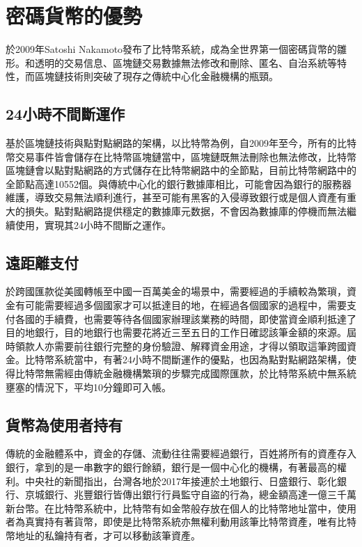 	\section{密碼貨幣的優勢}
	於2009年Satoshi Nakamoto發布了比特幣系統，成為全世界第一個密碼貨幣的雛形。和透明的交易信息、區塊鏈交易數據無法修改和刪除、匿名、⾃治系統等特性，而區塊鏈技術則突破了現存之傳統中⼼化⾦融機構的瓶頸。

		\subsection{24小時不間斷運作}
		基於區塊鏈技術與點對點網路的架構，以比特幣為例，自2009年至今，所有的比特幣交易事件皆會儲存在比特幣區塊鏈當中，區塊鏈既無法刪除也無法修改，比特幣區塊鏈會以點對點網路的方式儲存在比特幣網路中的全節點，目前比特幣網路中的全節點高達10552個。與傳統中心化的銀行數據庫相比，可能會因為銀行的服務器維護，導致交易無法順利進行，甚至可能有黑客的入侵導致銀行或是個人資產有重大的損失。點對點網路提供穩定的數據庫元数据，不會因為數據庫的停機而無法繼續使用，實現其24小時不間斷之運作。
		
		\subsection{遠距離支付}
		於跨國匯款從美國轉帳至中國一百萬美金的場景中，需要經過的手續較為繁瑣，資金有可能需要經過多個國家才可以抵達目的地，在經過各個國家的過程中，需要支付各國的手續費，也需要等待各個國家辦理該業務的時間，即使當資金順利抵達了目的地銀行，目的地銀行也需要花將近三至五日的工作日確認該筆金額的來源。屆時領款人亦需要前往銀行完整的身份驗證、解釋資金用途，才得以領取這筆跨國資金。比特幣系統當中，有著24小時不間斷運作的優點，也因為點對點網路架構，使得比特幣無需經由傳統金融機構繁瑣的步驟完成國際匯款，於比特幣系統中無系統壅塞的情況下，平均10分鐘即可入帳。

		\subsection{貨幣為使用者持有}
		傳統的金融體系中，資金的存儲、流動往往需要經過銀行，百姓將所有的資產存入銀行，拿到的是一串數字的銀行餘額，銀行是一個中心化的機構，有著最高的權利。中央社的新聞\supercite{Bankguardsstolen}指出，台灣各地於2017年接連於土地銀行、日盛銀行、彰化銀行、京城銀行、兆豐銀行皆傳出銀行行員監守自盜的行為，總金額高達一億三千萬新台幣。在比特幣系統中，比特幣有如金幣般存放在個人的比特幣地址當中，使用者為真實持有著貨幣，即使是比特幣系統亦無權利動用該筆比特幣資產，唯有比特幣地址的私鑰持有者，才可以移動該筆資產。

